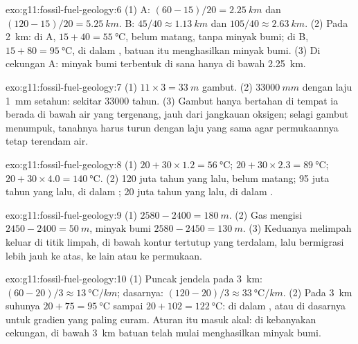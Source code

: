 \begin{solution}{exo:g11:fossil-fuel-geology:6}
(1) A: $(60 - 15)/20 = \qty{2.25}{km}$ dan $(120 - 15)/20 = \qty{5.25}{km}$.
B: $45/40 \approx \qty{1.13}{km}$ dan $105/40 \approx \qty{2.63}{km}$.
(2) Pada \qty{2}{km}: di A, $15 + 40 = \qty{55}{\degreeCelsius}$, belum
matang, tanpa minyak bumi; di B, $15 + 80 = \qty{95}{\degreeCelsius}$, di dalam
, batuan itu menghasilkan minyak bumi. (3) Di cekungan A: minyak
bumi terbentuk di sana hanya di bawah \qty{2.25}{km}.
\end{solution}

\begin{solution}{exo:g11:fossil-fuel-geology:7}
(1) $11 \times 3 = \qty{33}{m}$ gambut. (2) $\qty{33000}{mm}$ dengan laju
\qty{1}{mm} setahun: sekitar \num{33000} tahun. (3) Gambut hanya bertahan di
tempat ia berada di bawah air yang tergenang, jauh dari jangkauan oksigen;
selagi gambut menumpuk, tanahnya harus turun dengan laju yang sama agar
permukaannya tetap terendam air.
\end{solution}

\begin{solution}{exo:g11:fossil-fuel-geology:8}
(1) $20 + 30 \times 1.2 = \qty{56}{\degreeCelsius}$;
$20 + 30 \times 2.3 = \qty{89}{\degreeCelsius}$;
$20 + 30 \times 4.0 = \qty{140}{\degreeCelsius}$.
(2) 120 juta tahun yang lalu, belum matang; 95 juta tahun yang lalu, di dalam
; 20 juta tahun yang lalu, di dalam .
\end{solution}

\begin{solution}{exo:g11:fossil-fuel-geology:9}
(1) $2580 - 2400 = \qty{180}{m}$. (2) Gas mengisi
$2450 - 2400 = \qty{50}{m}$, minyak bumi $2580 - 2450 = \qty{130}{m}$.
(3) Keduanya melimpah keluar di titik limpah, di bawah kontur tertutup yang
terdalam, lalu bermigrasi lebih jauh ke atas, ke  lain atau ke
permukaan.
\end{solution}

\begin{solution}{exo:g11:fossil-fuel-geology:10}
(1) Puncak jendela pada \qty{3}{km}: $(60 - 20)/3 \approx
\qty{13}{\degreeCelsius/km}$; dasarnya: $(120 - 20)/3 \approx
\qty{33}{\degreeCelsius/km}$. (2) Pada \qty{3}{km} suhunya
$20 + 75 = \qty{95}{\degreeCelsius}$ sampai $20 + 102 = \qty{122}{\degreeCelsius}$:
di dalam , atau di dasarnya untuk gradien yang paling curam.
Aturan itu masuk akal: di kebanyakan cekungan,  di bawah
\qty{3}{km} batuan telah mulai menghasilkan minyak bumi.
\end{solution}

